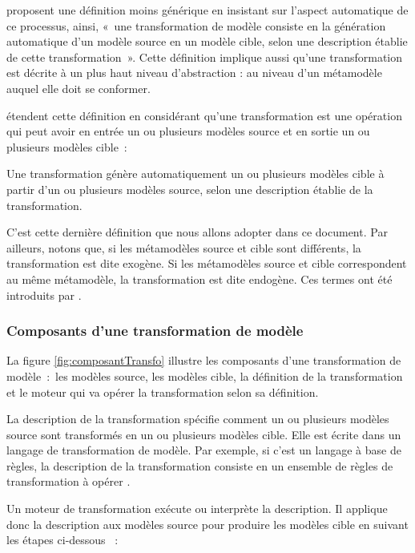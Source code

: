 \cite{kleppe2003mda} proposent une définition moins générique en insistant sur 
l'aspect automatique de ce processus, ainsi, «~une transformation de modèle 
consiste en la génération automatique d'un modèle source en un modèle cible, 
selon une description établie de cette transformation~». Cette définition 
implique aussi qu'une transformation est décrite à un plus haut niveau 
d'abstraction : au niveau d'un métamodèle auquel elle doit se conformer. 

\cite{mens2006taxonomy} étendent cette définition en considérant qu'une 
transformation est une opération qui peut avoir en entrée un ou plusieurs 
modèles source et en sortie un ou plusieurs modèles cible~: 

\begin{definition}
Une transformation génère automatiquement un ou plusieurs modèles cible à partir 
d'un ou plusieurs modèles source, selon une description établie de la 
transformation. 
\end{definition}

C'est cette dernière définition que nous allons adopter dans ce document. Par 
ailleurs, notons que, si les métamodèles source et cible sont différents, la 
transformation est dite exogène. Si les métamodèles source et cible 
correspondent au même métamodèle, la transformation est dite endogène. Ces 
termes ont été introduits par \cite{mens2006taxonomy}.

\subsubsection{Composants d'une transformation de modèle} 
La figure \ref{fig:composantTransfo} illustre les composants d'une 
transformation de modèle~:~les modèles source, les modèles cible, la définition 
de la transformation et le moteur qui va opérer la transformation selon sa 
définition. 

La description de la transformation spécifie comment un ou plusieurs modèles 
source sont transformés en un ou plusieurs modèles cible. Elle est écrite dans 
un langage de transformation de modèle. Par exemple, si c'est un langage à base 
de règles, la description de la transformation consiste en un ensemble de règles 
de transformation à opérer \cite{kleppe2003mda}. 

Un moteur de transformation exécute ou interprète la description. Il applique 
donc la description aux modèles source pour produire les modèles cible en 
suivant les étapes ci-dessous \cite{tratt2005model}~:

